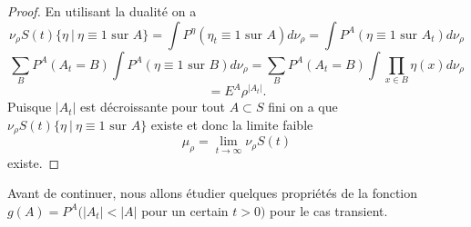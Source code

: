 \documentclass[a4paper,11pt]{article}
\theoremstyle{break}
\theoremstyle{break}
\theoremstyle{definition}
\theoremstyle{remark}
\begin{document}
\begin{proof}
En utilisant la dualité on a
$$
\nu_\rho S(t) \{ \eta \ \vert \ \eta \equiv 1 \text{ sur }A\} =\int P^\eta (\eta_t \equiv 1 \text{ sur }A ) d\nu_\rho = \int P^A (\eta \equiv 1 \text{ sur } A_t)d\nu_\rho
$$
$$
\sum\limits_B P^A (A_t=B)\int P^A (\eta \equiv 1 \text{ sur } B)d\nu_\rho=\sum\limits_B P^A (A_t=B) \int \prod\limits_{x\in B}\eta (x)  d\nu_\rho
$$
$$
=E^A \rho^{\vert A_t \vert}.
$$
Puisque $\vert A_t \vert$ est décroissante pour tout $A \subset S$ fini on a que $\nu_\rho S(t) \{ \eta \ \vert \ \eta \equiv 1 \text{ sur }A\}$ existe et donc la limite faible
$$
\mu_\rho= \lim_{t\rightarrow\infty} \nu_\rho S(t)
$$
existe.
\end{proof}

Avant de continuer, nous allons étudier quelques propriétés de la fonction $g(A)=P^A(\vert A_t\vert < \vert A \vert$ pour un certain $t > 0)$ pour le cas transient.
\end{document}
